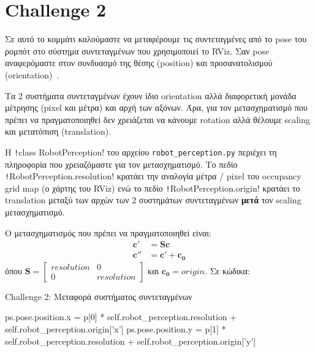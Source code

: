 \section{Challenge 2}
Σε αυτό το κομμάτι καλούμαστε να μεταφέρουμε τις συντεταγμένες από το pose του ρομπότ στο σύστημα συντεταγμένων που χρησιμοποιεί το RViz.
Σαν pose αναφερόμαστε στον συνδυασμό της θέσης (position) και προσανατολισμού (orientation)~\cite{shapiro2001computer}.

Τα 2 συστήματα συντεταγμένων έχουν ίδιο orientation αλλά διαφορετική μονάδα μέτρησης (pixel και μέτρα) και αρχή των αξόνων.
Άρα, για τον μετασχηματισμό που πρέπει να πραγματοποιηθεί δεν χρειάζεται να κάνουμε rotation αλλά θέλουμε scaling και μετατόπιση (translation).

\sloppy Η \texttt!class RobotPerception! του αρχείου \texttt{robot\_perception.py} περιέχει τη πληροφορία που χρειαζόμαστε για τον μετασχηματισμό.
Το πεδίο \texttt!RobotPerception.resolution! κρατάει την αναλογία μέτρα / pixel του occupancy grid map (ο χάρτης του RViz)
ενώ το πεδίο \texttt!RobotPerception.origin! κρατάει το translation μεταξύ των αρχών των 2 συστημάτων συντεταγμένων \textbf{μετά} τον scaling μετασχηματισμό.

Ο μετασχηματισμός που πρέπει να πραγματοποιηθεί είναι:
\begin{align}
    \mathbf{c'}  & = \mathbf{S} \mathbf{c}      \\
    \mathbf{c''} & = \mathbf{c'} + \mathbf{c_0}
\end{align}
όπου $\mathbf{S} = \begin{bmatrix}
resolution & 0 \\
0 & resolution
\end{bmatrix}$ και $\mathbf{c_0} = origin$.
Σε κώδικα:
\begin{code}
\caption{Challenge 2: Μεταφορά συστήματος συντεταγμένων}
\begin{pythoncode}
ps.pose.position.x = p[0] * self.robot_perception.resolution + self.robot_perception.origin['x']
ps.pose.position.y = p[1] * self.robot_perception.resolution + self.robot_perception.origin['y']
\end{pythoncode}
\end{code}
